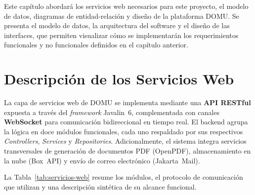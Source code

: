 Este capítulo abordará los servicios web necesarios para este proyecto, el modelo de datos, diagramas de entidad-relación y diseño de la plataforma DOMU. Se presenta el modelo de datos, la arquitectura del software y el diseño de las interfaces, que permiten visualizar cómo se implementarán los requerimientos funcionales y no funcionales definidos en el capítulo anterior.

\section{Descripción de los Servicios Web}

La capa de servicios web de DOMU se implementa mediante una \textbf{API RESTful} expuesta a través del \textit{framework} Javalin~6, complementada con canales \textbf{WebSocket} para comunicación bidireccional en tiempo real. El backend agrupa la lógica en doce módulos funcionales, cada uno respaldado por sus respectivos \textit{Controllers}, \textit{Services} y \textit{Repositories}. Adicionalmente, el sistema integra servicios transversales de generación de documentos PDF (OpenPDF), almacenamiento en la nube (Box~API) y envío de correo electrónico (Jakarta~Mail).

La Tabla~\ref{tab:servicios-web} resume los módulos, el protocolo de comunicación que utilizan y una descripción sintética de su alcance funcional.

